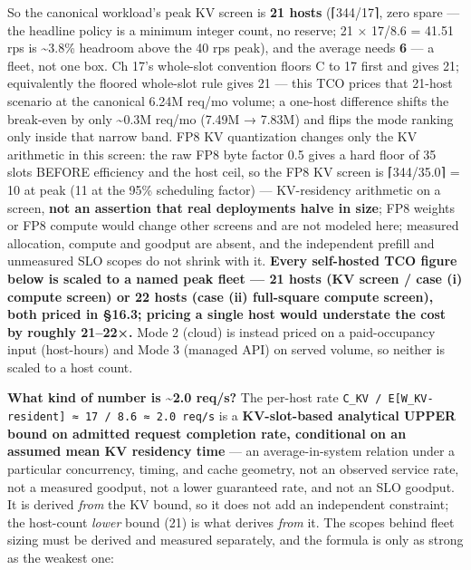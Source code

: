 So the canonical workload's peak KV screen is \textbf{21 hosts}
(⌈344/17⌉, zero spare --- the headline policy is a minimum integer
count, no reserve; 21 × 17/8.6 = 41.51 rps is \textasciitilde3.8\%
headroom above the 40 rps peak), and the average needs \textbf{6} --- a
fleet, not one box. Ch 17's whole-slot convention floors C to 17 first
and gives 21; equivalently the floored whole-slot rule gives 21 --- this
TCO prices that 21-host scenario at the canonical 6.24M req/mo volume; a
one-host difference shifts the break-even by only \textasciitilde0.3M
req/mo (7.49M → 7.83M) and flips the mode ranking only inside that
narrow band. FP8 KV quantization changes only the KV arithmetic in this
screen: the raw FP8 byte factor 0.5 gives a hard floor of 35 slots
BEFORE efficiency and the host ceil, so the FP8 KV screen is ⌈344/35.0⌉
= 10 at peak (11 at the 95\% scheduling factor) --- KV-residency
arithmetic on a screen, \textbf{not an assertion that real deployments
halve in size}; FP8 weights or FP8 compute would change other screens
and are not modeled here; measured allocation, compute and goodput are
absent, and the independent prefill and unmeasured SLO scopes do not
shrink with it. \textbf{Every self-hosted TCO figure below is scaled to
a named peak fleet --- 21 hosts (KV screen / case (i) compute screen) or
22 hosts (case (ii) full-square compute screen), both priced in §16.3;
pricing a single host would understate the cost by roughly 21--22×.}
Mode 2 (cloud) is instead priced on a paid-occupancy input (host-hours)
and Mode 3 (managed API) on served volume, so neither is scaled to a
host count.

\textbf{What kind of number is \textasciitilde2.0 req/s?} The per-host
rate
\texttt{C\_KV\ /\ E{[}W\_KV-resident{]}\ ≈\ 17\ /\ 8.6\ ≈\ 2.0\ req/s}
is a \textbf{KV-slot-based analytical UPPER bound on admitted request
completion rate, conditional on an assumed mean KV residency time} ---
an average-in-system relation under a particular concurrency, timing,
and cache geometry, not an observed service rate, not a measured
goodput, not a lower guaranteed rate, and not an SLO goodput. It is
derived \emph{from} the KV bound, so it does not add an independent
constraint; the host-count \emph{lower} bound (21) is what derives
\emph{from} it. The scopes behind fleet sizing must be derived and
measured separately, and the formula is only as strong as the weakest
one:

